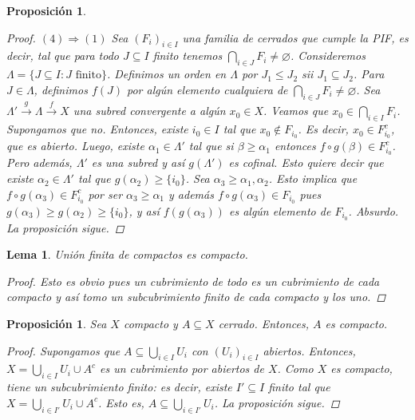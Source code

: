 \documentclass[12pt]{book}
\newtheorem{lem}[teo]{Lema}
\newtheorem{prop}[teo]{Proposición}
\theoremstyle{definition}
\let\emptyset\varnothing
\begin{document}
\begin{prop}
\begin{proof}
$(4)\Longrightarrow(1)$ Sea $(F_i)_{i\in I}$ una familia de cerrados que cumple la PIF, es decir, tal que para todo $J\subseteq I$ finito tenemos $\displaystyle\bigcap_{i\in J} F_i \neq \emptyset$. Consideremos $\Lambda=\{J\subseteq I : J\text{ finito}\}$. Definimos un orden en $\Lambda$ por $J_1\leq J_2$ sii $J_1\subseteq J_2$. Para $J\in\Lambda$, definimos $f(J)$ por algún elemento cualquiera de $\displaystyle\bigcap_{i\in J}F_i \neq\emptyset$. Sea $\Lambda'\stackrel{g}{\longrightarrow}\Lambda\stackrel{f}{\longrightarrow}X$ una subred convergente a algún $x_0\in X$. Veamos que $x_0\in\displaystyle\bigcap_{i\in I}F_i$. Supongamos que no. Entonces, existe $i_0\in I$ tal que $x_0\notin F_{i_0}$. Es decir, $x_0\in F_{i_0}^c$, que es abierto. Luego, existe $\alpha_1\in\Lambda'$ tal que si $\beta\geq\alpha_1$ entonces $f\circ g(\beta)\in F_{i_0}^c$. Pero además, $\Lambda'$ es una subred y así $g(\Lambda')$ es cofinal. Esto quiere decir que existe $\alpha_2\in\Lambda'$ tal que $g(\alpha_2)\geq \{i_0\}$. Sea $\alpha_3\geq \alpha_1,\alpha_2$. Esto implica que $f\circ g(\alpha_3)\in F_{i_0}^c$ por ser $\alpha_3\geq \alpha_1$ y además $f\circ g(\alpha_3) \in F_{i_0}$ pues $g(\alpha_3)\geq g(\alpha_2)\geq \{i_0\}$, y así $f(g(\alpha_3))$ es algún elemento de $F_{i_0}$. Absurdo. La proposición sigue.

\end{proof}
\end{prop}

\begin{lem}
Unión finita de compactos es compacto.
\begin{proof}
Esto es obvio pues un cubrimiento de todo es un cubrimiento de cada compacto y así tomo un subcubrimiento finito de cada compacto y los uno.
\end{proof}
\end{lem}

\begin{prop}
Sea $X$ compacto y $A\subseteq X$ cerrado. Entonces, $A$ es compacto.
\begin{proof}
Supongamos que $A\subseteq \displaystyle\bigcup_{i\in I}U_i$ con $(U_i)_{i\in I}$ abiertos. Entonces, $X=\displaystyle\bigcup_{i\in I}U_i \cup A^c$ es un cubrimiento por abiertos de $X$. Como $X$ es compacto, tiene un subcubrimiento finito: es decir, existe $I'\subseteq I$ finito tal que $X = \displaystyle\bigcup_{i\in I'}U_i \cup A^c$. Esto es, $A\subseteq \displaystyle\bigcup_{i\in I'} U_i$. La proposición sigue.
\end{proof}
\end{prop}
\end{document}
